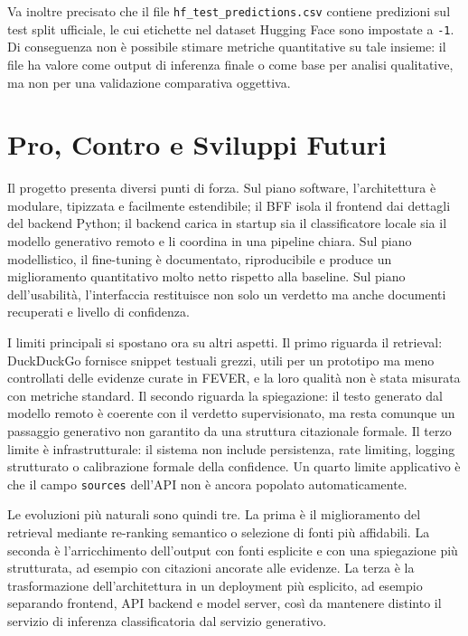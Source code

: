 \documentclass[10pt,a4paper]{article}
\begin{document}
Va inoltre precisato che il file \texttt{hf\_test\_predictions.csv} contiene predizioni sul test split ufficiale, le cui etichette nel dataset Hugging Face sono impostate a \texttt{-1}. Di conseguenza non è possibile stimare metriche quantitative su tale insieme: il file ha valore come output di inferenza finale o come base per analisi qualitative, ma non per una validazione comparativa oggettiva.

\section{Pro, Contro e Sviluppi Futuri}

Il progetto presenta diversi punti di forza. Sul piano software, l'architettura è modulare, tipizzata e facilmente estendibile; il BFF isola il frontend dai dettagli del backend Python; il backend carica in startup sia il classificatore locale sia il modello generativo remoto e li coordina in una pipeline chiara. Sul piano modellistico, il fine-tuning è documentato, riproducibile e produce un miglioramento quantitativo molto netto rispetto alla baseline. Sul piano dell'usabilità, l'interfaccia restituisce non solo un verdetto ma anche documenti recuperati e livello di confidenza.

I limiti principali si spostano ora su altri aspetti. Il primo riguarda il retrieval: DuckDuckGo fornisce snippet testuali grezzi, utili per un prototipo ma meno controllati delle evidenze curate in FEVER, e la loro qualità non è stata misurata con metriche standard. Il secondo riguarda la spiegazione: il testo generato dal modello remoto è coerente con il verdetto supervisionato, ma resta comunque un passaggio generativo non garantito da una struttura citazionale formale. Il terzo limite è infrastrutturale: il sistema non include persistenza, rate limiting, logging strutturato o calibrazione formale della confidence. Un quarto limite applicativo è che il campo \texttt{sources} dell'API non è ancora popolato automaticamente.

Le evoluzioni più naturali sono quindi tre. La prima è il miglioramento del retrieval mediante re-ranking semantico o selezione di fonti più affidabili. La seconda è l'arricchimento dell'output con fonti esplicite e con una spiegazione più strutturata, ad esempio con citazioni ancorate alle evidenze. La terza è la trasformazione dell'architettura in un deployment più esplicito, ad esempio separando frontend, API backend e model server, così da mantenere distinto il servizio di inferenza classificatoria dal servizio generativo.
\end{document}
